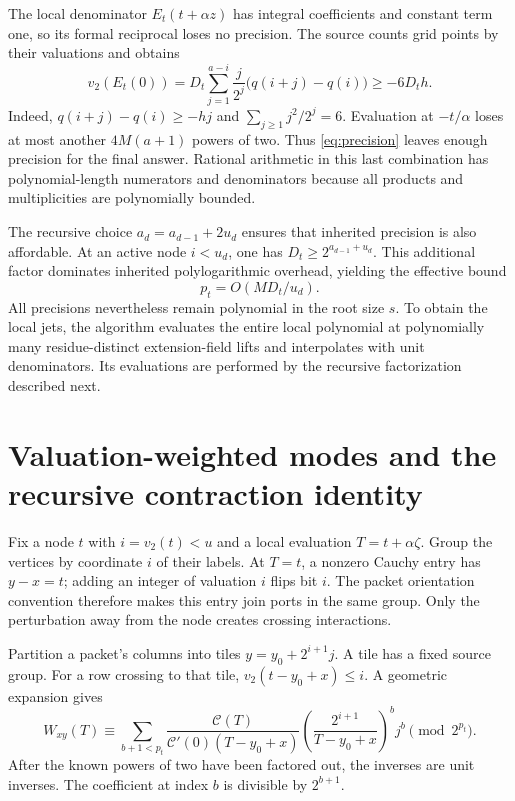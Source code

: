 \documentclass[11pt,a4paper]{article}
\numberwithin{equation}{section}
\theoremstyle{definition}
\theoremstyle{remark}
\begin{document}
The local denominator $E_t(t+\alpha z)$ has integral coefficients and constant
term one, so its formal reciprocal loses no precision. The source counts
grid points by their valuations and obtains
\begin{equation}\label{eq:valuationloss}
 v_2(E_t(0))=
 D_t\sum_{j=1}^{a-i}\frac{j}{2^j}\bigl(q(i+j)-q(i)\bigr)
 \ge-6D_th.
\end{equation}
Indeed, $q(i+j)-q(i)\ge-hj$ and $\sum_{j\ge1}j^2/2^j=6$.
Evaluation at $-t/\alpha$ loses at most another $4M(a+1)$ powers of two.
Thus \eqref{eq:precision} leaves enough precision for the final answer.
Rational arithmetic in this last combination has polynomial-length
numerators and denominators because all products and multiplicities are
polynomially bounded.

The recursive choice $a_d=a_{d-1}+2u_d$ ensures that inherited precision is
also affordable. At an active node $i<u_d$, one has
$D_t\ge2^{a_{d-1}+u_d}$. This additional factor dominates inherited
polylogarithmic overhead, yielding the effective bound
\begin{equation}\label{eq:effectiveprecision}
 p_t=O(MD_t/u_d).
\end{equation}
All precisions nevertheless remain polynomial in the root size $s$.
To obtain the local jets, the algorithm evaluates the entire local polynomial
at polynomially many residue-distinct extension-field lifts and interpolates
with unit denominators. Its evaluations are performed by the recursive
factorization described next.

\section{Valuation-weighted modes and the recursive contraction identity}
\label{sec:modes}
Fix a node $t$ with $i=v_2(t)<u$ and a local evaluation $T=t+\alpha\zeta$.
Group the vertices by coordinate $i$ of their labels. At $T=t$, a nonzero
Cauchy entry has $y-x=t$; adding an integer of valuation $i$ flips bit $i$.
The packet orientation convention therefore makes this entry join ports in
the same group. Only the perturbation away from the node creates crossing
interactions.

Partition a packet's columns into tiles
$y=y_0+2^{i+1}j$. A tile has a fixed source group. For a row crossing to
that tile, $v_2(t-y_0+x)\le i$. A geometric expansion gives
\begin{equation}\label{eq:modeexpansion}
 W_{xy}(T)\equiv
 \sum_{b+1<p_t}
 \frac{\mathcal C(T)}{\mathcal C'(0)(T-y_0+x)}
 \left(\frac{2^{i+1}}{T-y_0+x}\right)^b j^b
 \pmod{2^{p_t}}.
\end{equation}
After the known powers of two have been factored out, the inverses are unit
inverses. The coefficient at index $b$ is divisible by $2^{b+1}$.
\end{document}
